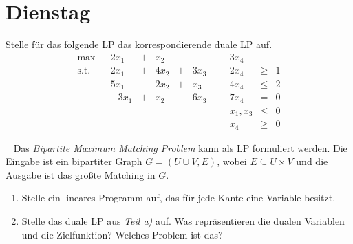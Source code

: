 \documentclass{uebung_cs}
\begin{document}
\section*{Dienstag}

\begin{exercise}
	Stelle für das folgende \acs{LP} das korrespondierende duale \acs{LP} auf.
	\[
		\begin{array}{rrrlllllllll}
		\text{max}    &     &   2 x_1       &   +     &   x_2   &       &         &   -   & 3x_4  &         &   \\
		\text{s.t.}  &     &   2x_1      &   +     &   4x_2  &   +   &  3 x_3   &   -   & 2x_4   &  \geq   & 1 \\
							&     &   5x_1      &   -     &   2x_2   &   +   &   x_3  &   -   & 4x_4  &  \leq   & 2 \\
							&     &   -3x_1     & +     &   x_2  &   -   &   6x_3  &   -   & 7 x_4   &   =     & 0 \\
							&     &           &       &         &       &       &         &x_1,x_3   & \leq    &   0      \\
							&     &          &       &         &       &       &         &  x_4       & \geq    &   0    
		\end{array}
	\]
	
\end{exercise}

\begin{exercise}\
	Das \emph{Bipartite Maximum Matching Problem} kann als \acs{LP} formuliert werden. Die Eingabe ist ein bipartiter Graph $G = (U \cup V, E)$, wobei $E \subseteq U \times V$ und die Ausgabe ist das größte Matching in $G$.
	\begin{enumerate}
		\item Stelle ein lineares Programm auf, das für jede Kante eine Variable besitzt.
		\item Stelle das duale \acs{LP} aus \emph{Teil a)} auf. Was repräsentieren die dualen Variablen und die Zielfunktion? Welches Problem ist das?
	\end{enumerate}
\end{exercise}
\end{document}
